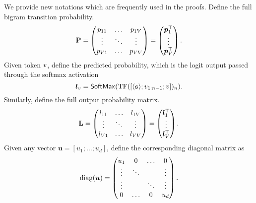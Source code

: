 We provide new notations which are frequently used in the proofs. Define the full bigram transition probability. 
\begin{equation}\label{appeqn:P-matrix}
\mathbf{P} = \left(\begin{matrix}
p_{11} & \ldots & p_{1V}\\
\vdots & \ddots & \vdots \\
p_{V 1} & \ldots & p_{VV}\\
\end{matrix}\right) = \left(\begin{matrix}
\bm{p}_1^\top\\
\vdots \\
\bm{p}_V^\top\\
\end{matrix}\right).
\end{equation}
Given token $v$, define the predicted probability, which is the logit output passed through the softmax activation 
\begin{equation}\label{appeqn:pred-prob}
\bm{l}_{v} = {\sf SoftMax}({\rm TF}([\texttt{$\langle \texttt{s}\rangle$}; v_{1:n-1}; v])_n).
\end{equation}
Similarly, define the full output probability matrix.
\begin{equation}\label{appeqn:Q-matrix}
\mathbf{L} = \left(\begin{matrix}
l_{11} & \ldots & l_{1V}\\
\vdots & \ddots & \vdots \\
l_{V 1} & \ldots & l_{VV}\\
\end{matrix}\right) = \left(\begin{matrix}
\bm{l}_1^\top\\
\vdots \\
\bm{l}_V^\top\\
\end{matrix}\right).
\end{equation}
Given any vector $\bm{u}=[u_1;\ldots;u_d]$, define the corresponding diagonal matrix as
\[
\operatorname{diag}(\bm{u}) = \left(\begin{matrix}
u_{1} & 0 & \ldots & 0\\
\vdots & \ddots &  & \vdots \\
\vdots & & \ddots & \vdots \\
0 & \ldots & 0 & u_d \\
\end{matrix}\right).
\]
